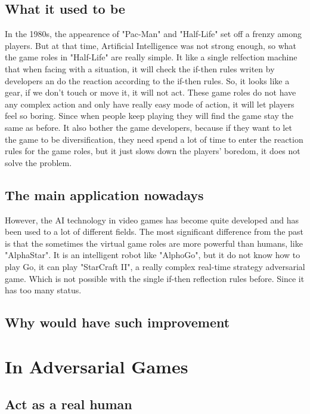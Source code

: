 \documentclass[12pt]{article}
\begin{document}
        \subsection{What it used to be}
            In the 1980s, the appearence of "Pac-Man" and "Half-Life" set off a frenzy among players.
            But at that time, Artificial Intelligence was not strong enough, so what the game roles
            in "Half-Life" are really simple. It like a single relfection machine that when facing
            with a situation, it will check the if-then rules writen by developers an do the reaction
            according to the if-then rules. So, it looks like a gear, if we don't touch or move it,
            it will not act. These game roles do not have any complex action and only have really
            easy mode of action, it will let players feel so boring. Since when people keep playing
            they will find the game stay the same as before. It also bother the game developers,
            because if they want to let the game to be diversification, they need spend a lot of
            time to enter the reaction rules for the game roles, but it just slows down the players'
            boredom, it does not solve the problem.
        \subsection{The main application nowadays}
            However, the AI technology in video games has become quite developed and has been used
            to a lot of different fields. The most significant difference from the past is that the
            sometimes the virtual game roles are more powerful than humans, like "AlphaStar". It is
            an intelligent robot like "AlphoGo", but it do not know how to play Go, it can play
            "StarCraft II", a really complex real-time strategy adversarial game. Which is not
            possible with the single if-then reflection rules before. Since it has too many status.

        \subsection{Why would have such improvement}
    \section{In Adversarial Games}
        \subsection{Act as a real human}
\end{document}
